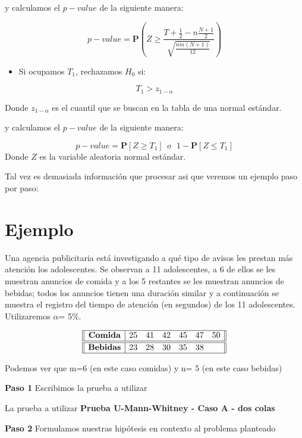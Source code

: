 \documentclass[
  a4paper,
  oneside,
  openany]{book}
\providecommand{\tightlist}{%
  \setlength{\itemsep}{0pt}\setlength{\parskip}{0pt}}
\begin{document}
y calculamos el \(p-value\) de la siguiente manera:

\[p-value = \mathbf{P}\left(Z\geq\frac{T+\frac{1}{2}-n\frac{N+1}{2}}{\sqrt{\frac{nm(N+1)}{12}}}\right)\]

\begin{itemize}
\tightlist
\item
  Si ocupamos \(T_{1}\), rechazamos \(H_0\) si:
\end{itemize}

\[T_{1} > z_{1-\alpha}\]

Donde \(z_{1-\alpha}\) es el cuantil que se buscan en la tabla de una normal estándar.

y calculamos el \(p-value\) de la siguiente manera:

\[p-value=\mathbf{P}[Z\geq T_{1}] \ \ o \ \  \ 1-\mathbf{P}[Z\leq T_{1}]\]
Donde \(Z\) es la variable aleatoria normal estándar.

Tal vez es demasiada información que procesar asi que veremos un ejemplo paso por paso:

\hypertarget{ejemplo-5}{%
\section{Ejemplo}\label{ejemplo-5}}

Una agencia publicitaria está investigando a qué tipo de avisos les prestan más atención los adolescentes. Se observan a 11 adolescentes, a 6 de ellos se les muestran anuncios de comida y a los 5 restantes se les muestran anuncios de bebidas; todos los anuncios tienen una duración similar y a continuación se muestra el registro del tiempo de atención (en segundos) de los 11 adolescentes.
Utilizaremos \(\alpha\)= 5\%.

\[
\begin{array}{||c| c c c c c c||} 
\hline
\textbf{Comida} & 25 & 41 & 42 & 45 & 47 & 50 \\
\hline\hline
\textbf{Bebidas}& 23 & 28 & 30 & 35 & 38 &  \\ 
\hline
\end{array}
\]

Podemos ver que m=6 (en este caso comidas) y n= 5 (en este caso bebidas)

\textbf{Paso 1} Escribimos la prueba a utilizar

La prueba a utilizar \textbf{Prueba U-Mann-Whitney - Caso A - dos colas}

\textbf{Paso 2} Formulamos nuestras hipótesis en contexto al problema planteado
\end{document}

